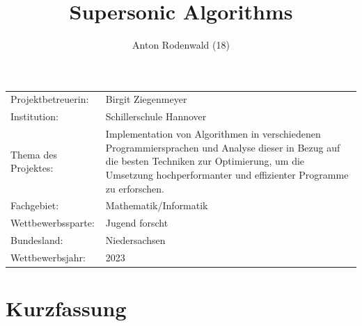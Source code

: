 \documentclass[11pt,a4paper]{article}
\begin{document}
\addtocounter{page}{-2}


\title{Supersonic Algorithms}
\author{Anton Rodenwald (18)}

\maketitle

\thispagestyle{empty}

\large\begin{tabular}{l p{12cm}}

    Projektbetreuerin: & Birgit Ziegenmeyer                                                  \\

    Institution:       & Schillerschule Hannover                                             \\

    Thema des Projektes:
                       & Implementation von Algorithmen in verschiedenen Programmiersprachen
    und Analyse dieser in Bezug auf die besten Techniken zur Optimierung,
    um die Umsetzung hochperformanter und effizienter Programme zu erforschen.               \\

    Fachgebiet:        & Mathematik/Informatik                                               \\

    Wettbewerbssparte: & Jugend forscht                                                      \\

    Bundesland:        & Niedersachsen                                                       \\

    Wettbewerbsjahr:   & 2023                                                                \\
\end{tabular}


\clearpage


\thispagestyle{empty}

\section*{Kurzfassung}
\end{document}

